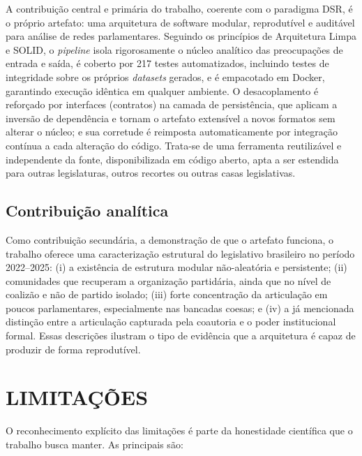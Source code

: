 \documentclass[
      12pt,
      a4paper,
      openright,
      oneside,
      chapter=TITLE,
      section=TITLE,
      english,
      french,
      spanish,
      brazilian
    ]{abntex2}
\begin{document}
    A contribuição central e primária do trabalho, coerente com o paradigma DSR, é o próprio artefato: uma arquitetura de software modular, reprodutível e auditável para análise de redes parlamentares. Seguindo os princípios de Arquitetura Limpa e SOLID, o \textit{pipeline} isola rigorosamente o núcleo analítico das preocupações de entrada e saída, é coberto por 217 testes automatizados, incluindo testes de integridade sobre os próprios \textit{datasets} gerados, e é empacotado em Docker, garantindo execução idêntica em qualquer ambiente. O desacoplamento é reforçado por interfaces (contratos) na camada de persistência, que aplicam a inversão de dependência e tornam o artefato extensível a novos formatos sem alterar o núcleo; e sua corretude é reimposta automaticamente por integração contínua a cada alteração do código. Trata-se de uma ferramenta reutilizável e independente da fonte, disponibilizada em código aberto, apta a ser estendida para outras legislaturas, outros recortes ou outras casas legislativas.
    
    \subsection{Contribuição analítica}
    
    Como contribuição secundária, a demonstração de que o artefato funciona, o trabalho oferece uma caracterização estrutural do legislativo brasileiro no período 2022--2025: (i) a existência de estrutura modular não-aleatória e persistente; (ii) comunidades que recuperam a organização partidária, ainda que no nível de coalizão e não de partido isolado; (iii) forte concentração da articulação em poucos parlamentares, especialmente nas bancadas coesas; e (iv) a já mencionada distinção entre a articulação capturada pela coautoria e o poder institucional formal. Essas descrições ilustram o tipo de evidência que a arquitetura é capaz de produzir de forma reprodutível.
    
    \section{LIMITAÇÕES}
    
    O reconhecimento explícito das limitações é parte da honestidade científica que o trabalho busca manter. As principais são:
    
\end{document}
